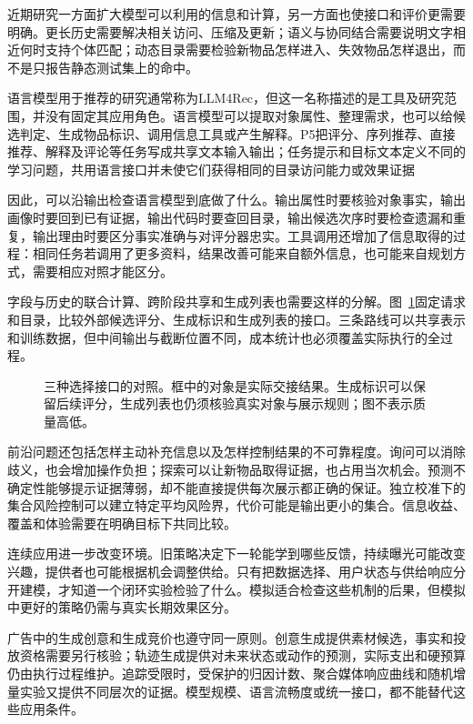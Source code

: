近期研究一方面扩大模型可以利用的信息和计算，另一方面也使接口和评价更需要明确。更长历史需要解决相关访问、压缩及更新；语义与协同结合需要说明文字相近何时支持个体匹配；动态目录需要检验新物品怎样进入、失效物品怎样退出，而不是只报告静态测试集上的命中。

语言模型用于推荐的研究通常称为LLM4Rec，但这一名称描述的是工具及研究范围，并没有固定其应用角色。语言模型可以提取对象属性、整理需求，也可以给候选判定、生成物品标识、调用信息工具或产生解释。P5把评分、序列推荐、直接推荐、解释及评论等任务写成共享文本输入输出；任务提示和目标文本定义不同的学习问题，共用语言接口并未使它们获得相同的目录访问能力或效果证据

因此，可以沿输出检查语言模型到底做了什么。输出属性时要核验对象事实，输出画像时要回到已有证据，输出代码时要查回目录，输出候选次序时要检查遗漏和重复，输出理由时要区分事实准确与对评分器忠实。工具调用还增加了信息取得的过程：相同任务若调用了更多资料，结果改善可能来自额外信息，也可能来自规划方式，需要相应对照才能区分。

字段与历史的联合计算、跨阶段共享和生成列表也需要这样的分解。图~\ref{fig:rs-interface-comparison}固定请求和目录，比较外部候选评分、生成标识和生成列表的接口。三条路线可以共享表示和训练数据，但中间输出与截断位置不同，成本统计也必须覆盖实际执行的全过程。

\begin{figure}[htbp]
  \centering
  
  \caption{三种选择接口的对照。框中的对象是实际交接结果。生成标识可以保留后续评分，生成列表也仍须核验真实对象与展示规则；图不表示质量高低。}
  \label{fig:rs-interface-comparison}
\end{figure}

前沿问题还包括怎样主动补充信息以及怎样控制结果的不可靠程度。询问可以消除歧义，也会增加操作负担；探索可以让新物品取得证据，也占用当次机会。预测不确定性能够提示证据薄弱，却不能直接提供每次展示都正确的保证。独立校准下的集合风险控制可以建立特定平均风险界，代价可能是输出更小的集合。信息收益、覆盖和体验需要在明确目标下共同比较。

连续应用进一步改变环境。旧策略决定下一轮能学到哪些反馈，持续曝光可能改变兴趣，提供者也可能根据机会调整供给。只有把数据选择、用户状态与供给响应分开建模，才知道一个闭环实验检验了什么。模拟适合检查这些机制的后果，但模拟中更好的策略仍需与真实长期效果区分。

广告中的生成创意和生成竞价也遵守同一原则。创意生成提供素材候选，事实和投放资格需要另行核验；轨迹生成提供对未来状态或动作的预测，实际支出和硬预算仍由执行过程维护。追踪受限时，受保护的归因计数、聚合媒体响应曲线和随机增量实验又提供不同层次的证据。模型规模、语言流畅度或统一接口，都不能替代这些应用条件。

